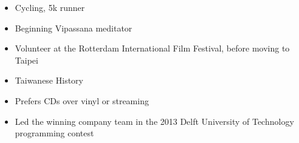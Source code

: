 





\begin{itemize}
	\item\small{Cycling, 5k runner}
	\item\small{Beginning Vipassana meditator}
	\item\small{Volunteer at the Rotterdam International Film Festival, before moving to Taipei}
	\item\small{Taiwanese History}
	\item\small{Prefers CDs over vinyl or streaming}
	\item\small{Led the winning company team in the 2013 Delft University of Technology programming contest}
\end{itemize}

%